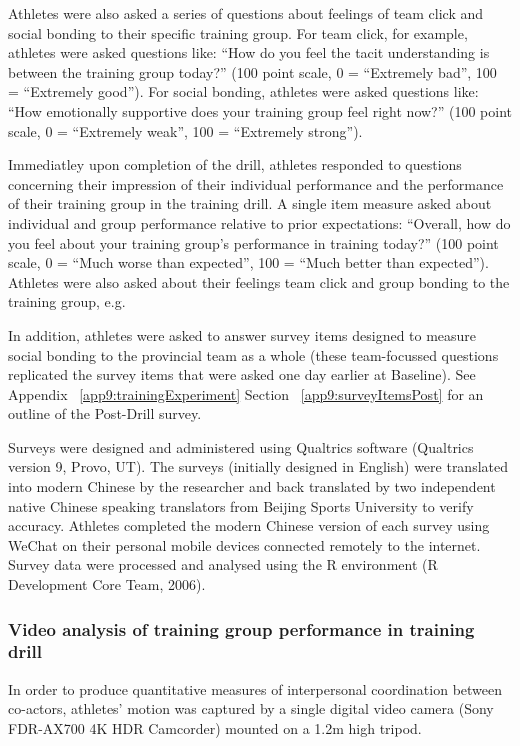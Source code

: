 Athletes were also asked a series of questions about feelings of team click and social bonding to their specific training group. For team click, for example, athletes were asked questions like: ``How do you feel the tacit understanding is between the training group today?'' (100 point scale, 0 = ``Extremely bad'', 100 = ``Extremely good'').  For social bonding, athletes were asked questions like: ``How emotionally supportive does your training group feel right now?'' (100 point scale, 0 = ``Extremely weak'', 100 = ``Extremely strong'').


Immediatley upon completion of the drill, athletes responded to questions concerning their impression of their individual performance and the performance of their training group in the training drill. A  single item measure asked about individual and group performance relative to prior expectations: ``Overall, how do you feel about your training group's performance in training today?'' (100 point scale, 0 = ``Much worse than expected'', 100 = ``Much better than expected'').  Athletes were also asked about their feelings team click and group bonding to the training group, e.g.

In addition, athletes were asked to answer survey items designed to measure social bonding to the provincial team as a whole (these team-focussed questions replicated the survey items that were asked one day earlier at Baseline).  See Appendix ~\ref{app9:trainingExperiment} Section ~\ref{app9:surveyItemsPost} for an outline of the Post-Drill survey.

Surveys were designed and administered using Qualtrics software (Qualtrics version 9, Provo, UT). The surveys (initially designed in English) were translated into modern Chinese by the researcher and back translated by two independent native Chinese speaking translators from Beijing Sports University to verify accuracy.  Athletes completed the modern Chinese version of each survey using WeChat on their personal mobile devices connected remotely to the internet. Survey data were processed and analysed using the R environment (R Development Core Team, 2006).

\subsubsection{Video analysis of training group performance in training drill\label{sec:videoAnalysis}}
In order to produce quantitative measures of interpersonal coordination between co-actors, athletes’ motion was captured by a single digital video camera (Sony FDR-AX700 4K HDR Camcorder) mounted on a 1.2m high tripod.

